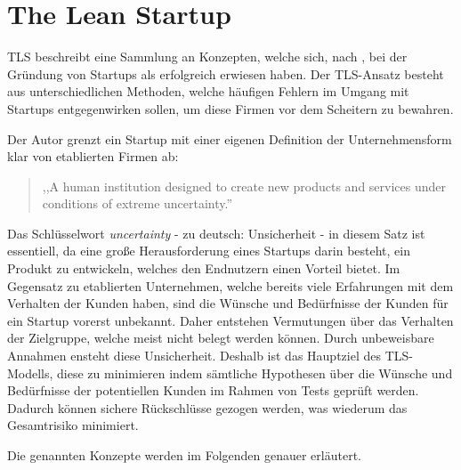 \section{The Lean Startup}
\label{sec:LeanStartup}
\ac{TLS} beschreibt eine Sammlung an Konzepten, welche sich, nach , bei der Gründung von Startups als erfolgreich erwiesen haben. Der \ac{TLS}-Ansatz besteht aus unterschiedlichen Methoden, welche häufigen Fehlern im Umgang mit Startups entgegenwirken sollen, um diese Firmen vor dem Scheitern zu bewahren.

Der Autor grenzt ein Startup mit einer eigenen Definition der Unternehmensform klar von etablierten Firmen ab:
\begin{quote}
,,A human institution designed to create new products and services under conditions of extreme uncertainty.'' \cite{TheLeanStartup}
\end{quote}
Das Schlüsselwort \textit{uncertainty} - zu deutsch: Unsicherheit - in diesem Satz ist essentiell, da eine große Herausforderung eines Startups darin besteht, ein Produkt zu entwickeln, welches den Endnutzern einen Vorteil bietet. Im Gegensatz zu etablierten Unternehmen, welche bereits viele Erfahrungen mit dem Verhalten der Kunden haben, sind die Wünsche und Bedürfnisse der Kunden für ein Startup vorerst unbekannt. Daher entstehen Vermutungen über das Verhalten der Zielgruppe, welche meist nicht belegt werden können. Durch unbeweisbare Annahmen ensteht diese Unsicherheit. Deshalb ist das Hauptziel des \ac{TLS}-Modells, diese zu minimieren indem sämtliche Hypothesen über die Wünsche und Bedürfnisse der potentiellen Kunden im Rahmen von Tests geprüft werden. Dadurch können sichere Rückschlüsse gezogen werden, was wiederum das Gesamtrisiko minimiert.

Die genannten Konzepte werden im Folgenden genauer erläutert.

